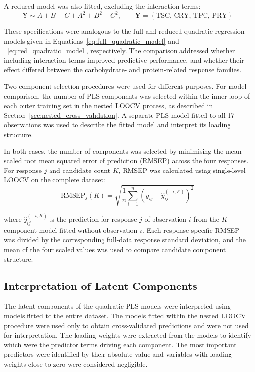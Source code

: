 \documentclass[MScDSA]{uccthesis}
\begin{document}
A reduced model was also fitted, excluding the interaction terms:
\begin{equation}
\mathbf{Y} \sim A + B + C + A^2 + B^2 + C^2,
\qquad
\mathbf{Y} = \left(\mathrm{TSC},\,
\mathrm{CRY},\,
\mathrm{TPC},\,
\mathrm{PRY}
\right)
\label{eq:reduced_pls_regression}
\end{equation}

These specifications were analogous to the full and reduced quadratic regression models given in Equations~\ref{eq:full_quadratic_model} and ~\ref{eq:red_quadratic_model}, respectively. The comparison addressed  whether including interaction terms improved predictive performance, and whether their effect differed between the carbohydrate- and protein-related response families.

Two component-selection procedures were used for different purposes. For model comparison, the number of PLS components was selected within the inner loop of each outer training set in the nested LOOCV process, as described in Section~\ref{sec:nested_cross_validation}. A separate PLS model fitted to all 17 observations was used to describe the fitted model and interpret its loading structure.

In both cases, the number of components was selected by minimising the mean scaled root mean squared error of prediction (RMSEP) across the four responses. For response $j$ and candidate count $K$, RMSEP was calculated using single-level LOOCV on the complete dataset:
\begin{equation}
\mathrm{RMSEP}_{j}(K) = \sqrt{\frac{1}{n}\sum_{i=1}^{n} \left(y_{ij}-\hat{y}_{ij}^{(-i,K)}\right)^2}
\label{eq:pls_rmsep}
\end{equation}

where $\hat{y}_{ij}^{(-i,K)}$ is the prediction for response $j$ of observation $i$ from the $K$-component model fitted without observation $i$. Each response-specific RMSEP was divided by the corresponding full-data response standard deviation, and the mean of the four scaled values was used to compare candidate component structure.

\subsection{Interpretation of Latent Components}
\label{sec:latent_components}
The latent components of the quadratic PLS models were interpreted using models fitted to the entire dataset. The  models fitted within the nested LOOCV procedure were used only to obtain cross-validated predictions and were not used for interpretation. The loading weights were extracted from the models to identify which were the predictor terms driving each component. The most important predictors were identified by their absolute value and variables with loading weights close to zero were considered negligible.
\end{document}
